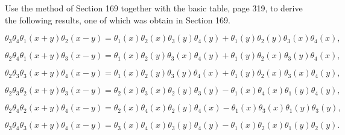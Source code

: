 \begin{problem}\label{problem10chapter20}
Use the method of Section 169 together with the basic table, page 319, to derive the following results, one of which was obtain in Section 169.

$$\theta_3\theta_4\theta_1(x+y)\theta_2(x-y)=\theta_1(x)\theta_2(x)\theta_3(y)\theta_4(y)+\theta_1(y)\theta_2(y)\theta_3(x)\theta_4(x),$$

$$\theta_2\theta_4\theta_1(x+y)\theta_3(x-y)=\theta_1(x)\theta_2(y)\theta_3(x)\theta_4(y)+\theta_1(y)\theta_2(x)\theta_3(y)\theta_4(x),$$

$$\theta_2\theta_3\theta_3(x+y)\theta_4(x-y)=\theta_1(x)\theta_2(y)\theta_3(y)\theta_4(x)+\theta_1(y)\theta_2(x)\theta_3(x)\theta_4(y),$$

$$\theta_2\theta_3\theta_2(x+y)\theta_3(x-y)=\theta_2(x)\theta_3(x)\theta_2(y)\theta_3(y)-\theta_1(x)\theta_4(x)\theta_1(y)\theta_4(y),$$

$$\theta_2\theta_4\theta_2(x+y)\theta_4(x-y)=\theta_2(x)\theta_4(x)\theta_2(y)\theta_4(x)-\theta_1(x)\theta_3(x)\theta_1(y)\theta_3(y),$$

$$\theta_3\theta_4\theta_3(x+y)\theta_4(x-y)=\theta_3(x)\theta_4(x)\theta_3(y)\theta_4(y)-\theta_1(x)\theta_2(x)\theta_1(y)\theta_2(y).$$
\end{problem}
